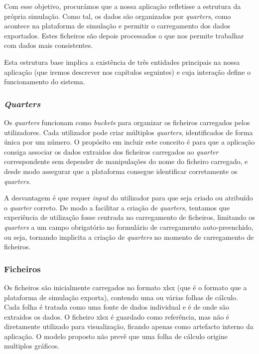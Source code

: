 Com esse objetivo, procurámos que a nossa aplicação refletisse a estrutura da própria simulação. Como tal, os dados são organizados por \textit{quarters}, como acontece na plataforma de simulação e permitir o carregamento dos dados exportados. Estes ficheiros são depois processados o que nos permite trabalhar com dados mais consistentes. 

Esta estrutura base implica a existência de três entidades principais na nossa aplicação (que iremos descrever nos capítulos seguintes) e cuja interação define  o funcionamento do sistema.

\subsubsection{\textit{Quarters}}

Os \textit{quarters} funcionam como \textit{buckets} para organizar os ficheiros carregados pelos utilizadores. Cada utilizador pode criar múltiplos \textit{quarters}, identificados de forma única por um número. O propósito em incluir este conceito é para que a aplicação consiga associar os dados extraidos dos ficheiros carregados ao \textit{quarter} correspondente sem depender de manipulações do nome do ficheiro carregado, e desde modo assegurar que a plataforma consegue identificar corretamente os \textit{quarters}. 

A desvantagem é que requer \textit{input} do utilizador para que seja criado ou atribuído o \textit{quarter} correto. De modo a facilitar a criação de \textit{quarters}, tentamos que experiência de utilização fosse centrada no carregamento de ficheiros, limitando os \textit{quarters} a um campo obrigatório no formulário de carregamento auto-preenchido, ou seja, tornando implicita a criação de \textit{quarters} no momento de carregamento de ficheiros.

\subsubsection{Ficheiros}

Os ficheiros são inicialmente carregados no formato \gls{xlsx} (que é o formato que a plataforma de simulação exporta), contendo uma ou várias folhas de cálculo. Cada folha é tratada como uma fonte de dados individual e é de onde são extraidos os dados. O ficheiro \gls{xlsx} é guardado como referência, mas não é diretamente utilizado para visualização, ficando apenas como artefacto interno da aplicação. O modelo proposto não prevê que uma folha de cálculo origine multiplos gráficos.

